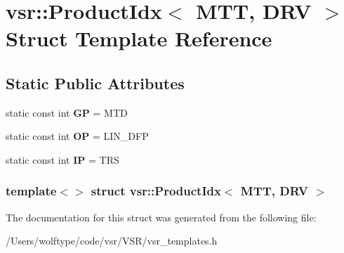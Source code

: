 \hypertarget{structvsr_1_1_product_idx_3_01_m_t_t_00_01_d_r_v_01_4}{\section{vsr\-:\-:Product\-Idx$<$ M\-T\-T, D\-R\-V $>$ Struct Template Reference}
\label{structvsr_1_1_product_idx_3_01_m_t_t_00_01_d_r_v_01_4}
}
\subsection*{Static Public Attributes}
\begin{DoxyCompactItemize}
\item 
\hypertarget{structvsr_1_1_product_idx_3_01_m_t_t_00_01_d_r_v_01_4_ada1497b4b829a1f499323f492f29799d}{static const int {\bfseries G\-P} = M\-T\-D}\label{structvsr_1_1_product_idx_3_01_m_t_t_00_01_d_r_v_01_4_ada1497b4b829a1f499323f492f29799d}

\item 
\hypertarget{structvsr_1_1_product_idx_3_01_m_t_t_00_01_d_r_v_01_4_a40941cb234e2b46ea0766a999682be6e}{static const int {\bfseries O\-P} = L\-I\-N\-\_\-\-D\-F\-P}\label{structvsr_1_1_product_idx_3_01_m_t_t_00_01_d_r_v_01_4_a40941cb234e2b46ea0766a999682be6e}

\item 
\hypertarget{structvsr_1_1_product_idx_3_01_m_t_t_00_01_d_r_v_01_4_a5da0adc8b2f1964f6a8713ae321ac378}{static const int {\bfseries I\-P} = T\-R\-S}\label{structvsr_1_1_product_idx_3_01_m_t_t_00_01_d_r_v_01_4_a5da0adc8b2f1964f6a8713ae321ac378}

\end{DoxyCompactItemize}
\subsubsection*{template$<$$>$ struct vsr\-::\-Product\-Idx$<$ M\-T\-T, D\-R\-V $>$}



The documentation for this struct was generated from the following file\-:\begin{DoxyCompactItemize}
\item 
/\-Users/wolftype/code/vsr/\-V\-S\-R/vsr\-\_\-templates.\-h\end{DoxyCompactItemize}
